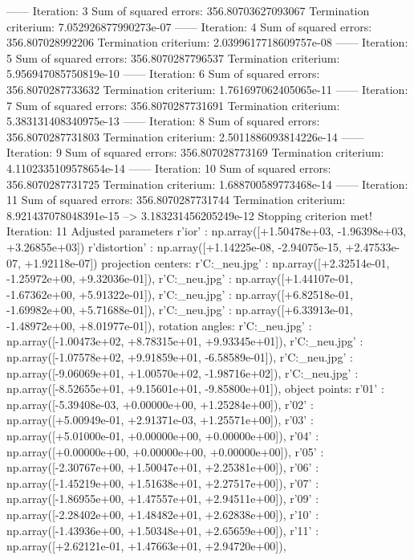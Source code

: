 ------ Iteration: 3
Sum of squared errors: 356.80703627093067
Termination criterium: 7.052926877990273e-07
------ Iteration: 4
Sum of squared errors: 356.807028992206
Termination criterium: 2.0399617718609757e-08
------ Iteration: 5
Sum of squared errors: 356.8070287796537
Termination criterium: 5.956947085750819e-10
------ Iteration: 6
Sum of squared errors: 356.8070287733632
Termination criterium: 1.761697062405065e-11
------ Iteration: 7
Sum of squared errors: 356.8070287731691
Termination criterium: 5.383131408340975e-13
------ Iteration: 8
Sum of squared errors: 356.8070287731803
Termination criterium: 2.5011886093814226e-14
------ Iteration: 9
Sum of squared errors: 356.807028773169
Termination criterium: 4.1102335109578654e-14
------ Iteration: 10
Sum of squared errors: 356.8070287731725
Termination criterium: 1.688700589773468e-14
------ Iteration: 11
Sum of squared errors: 356.8070287731744
Termination criterium: 8.921437078048391e-15
-->
3.183231456205249e-12
Stopping criterion met! Iteration: 11
Adjusted parameters
r'ior' : np.array([+1.50478e+03, -1.96398e+03, +3.26855e+03])
r'distortion' : np.array([+1.14225e-08, -2.94075e-15, +2.47533e-07, +1.92118e-07])
projection centers:
r'C:\Users\Clemens\Desktop\fotos_neu\1.jpg' : np.array([+2.32514e-01, -1.25972e+00, +9.32036e-01]),
r'C:\Users\Clemens\Desktop\fotos_neu\2.jpg' : np.array([+1.44107e-01, -1.67362e+00, +5.91322e-01]),
r'C:\Users\Clemens\Desktop\fotos_neu\3.jpg' : np.array([+6.82518e-01, -1.69982e+00, +5.71688e-01]),
r'C:\Users\Clemens\Desktop\fotos_neu\4.jpg' : np.array([+6.33913e-01, -1.48972e+00, +8.01977e-01]),
rotation angles:
r'C:\Users\Clemens\Desktop\fotos_neu\1.jpg' : np.array([-1.00473e+02, +8.78315e+01, +9.93345e+01]),
r'C:\Users\Clemens\Desktop\fotos_neu\2.jpg' : np.array([-1.07578e+02, +9.91859e+01, -6.58589e-01]),
r'C:\Users\Clemens\Desktop\fotos_neu\3.jpg' : np.array([-9.06069e+01, +1.00570e+02, -1.98716e+02]),
r'C:\Users\Clemens\Desktop\fotos_neu\4.jpg' : np.array([-8.52655e+01, +9.15601e+01, -9.85800e+01]),
object points:
r'01' : np.array([-5.39408e-03, +0.00000e+00, +1.25284e+00]),
r'02' : np.array([+5.00949e-01, +2.91371e-03, +1.25571e+00]),
r'03' : np.array([+5.01000e-01, +0.00000e+00, +0.00000e+00]),
r'04' : np.array([+0.00000e+00, +0.00000e+00, +0.00000e+00]),
r'05' : np.array([-2.30767e+00, +1.50047e+01, +2.25381e+00]),
r'06' : np.array([-1.45219e+00, +1.51638e+01, +2.27517e+00]),
r'07' : np.array([-1.86955e+00, +1.47557e+01, +2.94511e+00]),
r'09' : np.array([-2.28402e+00, +1.48482e+01, +2.62838e+00]),
r'10' : np.array([-1.43936e+00, +1.50348e+01, +2.65659e+00]),
r'11' : np.array([+2.62121e-01, +1.47663e+01, +2.94720e+00]),
